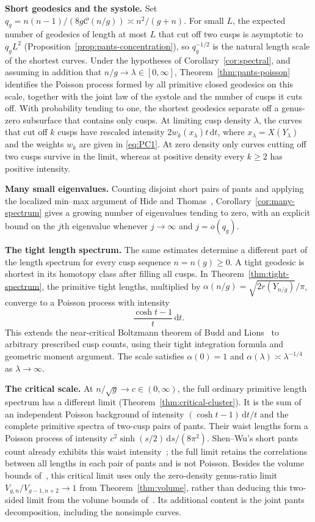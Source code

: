 \textbf{Short geodesics and the systole.} Set
$q_g=n(n-1)/(8g\mathcal C(n/g))\asymp n^2/(g+n)$. For small $L$, the
expected number of geodesics of length at most $L$ that cut off two cusps
is asymptotic to $q_gL^2$ (Proposition~\ref{prop:pants-concentration}), so
$q_g^{-1/2}$ is the natural length scale of the shortest curves. Under the
hypotheses of Corollary~\ref{cor:spectral}, and assuming in addition that
$n/g\to\lambda\in[0,\infty]$, Theorem~\ref{thm:pants-poisson} identifies
the Poisson process formed by all primitive closed geodesics on this
scale, together with the joint law of the systole and the number of cusps
it cuts off. With probability tending to one, the shortest geodesics
separate off a genus-zero subsurface that contains only cusps. At limiting
cusp density $\lambda$, the curves that cut off $k$ cusps have rescaled
intensity $2w_k(x_\lambda)t\,\mathrm{d}t$, where $x_\lambda=X(Y_\lambda)$
and the weights $w_k$ are given in \eqref{eq:PC1}. At zero density only
curves cutting off two cusps survive in the limit, whereas at positive
density every $k\ge2$ has positive intensity.

\textbf{Many small eigenvalues.} Counting disjoint short pairs of pants and
applying the localized min--max argument of Hide and
Thomas~\cite{HTSphere}, Corollary~\ref{cor:many-spectrum} gives a growing
number of eigenvalues tending to zero, with an explicit bound on the $j$th
eigenvalue whenever $j\to\infty$ and $j=o(q_g)$.

\textbf{The tight length spectrum.} The same estimates determine a different part of the length spectrum for every cusp sequence $n=n(g)\ge0$. A tight geodesic is shortest in its homotopy class after filling all cusps. In Theorem~\ref{thm:tight-spectrum}, the primitive tight lengths, multiplied by $\alpha(n/g)=\sqrt{2r(Y_{n/g})}/\pi$, converge to a Poisson process with intensity
\[
 \frac{\cosh t-1}{t}\,\mathrm dt.
\]
This extends the near-critical Boltzmann theorem of Budd and Lions~\cite{BL} to arbitrary prescribed cusp counts, using their tight integration formula and geometric moment argument. The scale satisfies $\alpha(0)=1$ and $\alpha(\lambda)\asymp\lambda^{-1/4}$ as $\lambda\to\infty$.

\textbf{The critical scale.} At $n/\sqrt g\to c\in(0,\infty)$, the full ordinary
primitive length spectrum has a different limit
(Theorem~\ref{thm:critical-cluster}). It is the sum of an independent
Poisson background of intensity $(\cosh t-1)\,\mathrm dt/t$ and
the complete primitive spectra of two-cusp pairs of pants. Their waist
lengths form a Poisson process of intensity
$c^2\sinh(s/2)\,\mathrm ds/(8\pi^2)$. Shen--Wu's short pants count
already exhibits this waist intensity~\cite[Lemmas~28 and~33]{SW};
the full limit retains the correlations between all lengths in each
pair of pants and is not Poisson. Besides the volume bounds
of~\cite{MZ,SW}, this critical limit uses only the zero-density
genus-ratio limit $V_{g,n}/V_{g-1,n+2}\to1$ from Theorem~\ref{thm:volume},
rather than deducing this two-sided limit from the volume bounds
of~\cite{MZ,SW}. Its additional content is the joint pants decomposition,
including the nonsimple curves.

